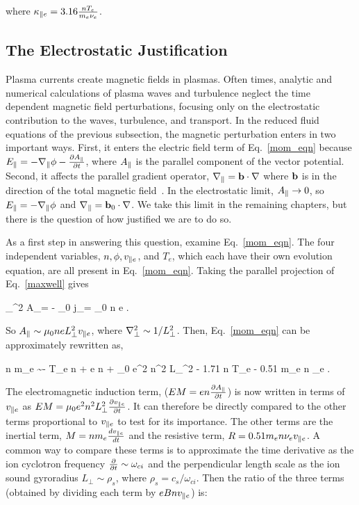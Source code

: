 where $\kappa_{\parallel e} = 3.16 \frac{n T_e}{m_e \nu_{e}}$.

\subsection{The Electrostatic Justification}
\label{ss_es_justification}

Plasma currents create magnetic fields in plasmas. Often times, analytic and numerical calculations
of plasma waves and turbulence neglect the time dependent magnetic field perturbations, focusing only on the electrostatic contribution to the waves, turbulence, and transport.
In the reduced fluid equations of the previous subsection, the magnetic perturbation enters in two important ways. First, it enters the electric field term of Eq.~\ref{mom_eqn}
because $E_\parallel = -\nabla_\parallel \phi - \frac{\partial A_\parallel}{\partial t}$, where $A_\parallel$ is the parallel component of the vector potential. Second, it affects the parallel gradient operator, 
$\nabla_\parallel = {\bf b} \cdot \nabla$ where ${\bf b}$ is in the direction of the total magnetic field~\cite{simakov2003}.
In the electrostatic limit, $A_\parallel \rightarrow 0$, so $E_\parallel = -\nabla_\parallel \phi$ and $\nabla_\parallel = {\bf b}_0 \cdot \nabla$. We take
this limit in the remaining chapters, but there is the question of how justified we are to do so. 

As a first step in answering this question, examine Eq.~\ref{mom_eqn}. The four independent variables, $n, \phi, v_{\parallel e}$, and $T_e$, which each have their own evolution equation, are all
present in Eq.~\ref{mom_eqn}. Taking the parallel projection of Eq.~\ref{maxwell} gives

\beq
\label{Apar_eqn}
\grad_\perp^2 A_\para = - \mu_0 j_\para = \mu_0 n e \vpe.
\eeq

So $A_\parallel \sim \mu_0 n e L_\perp^2 v_{\parallel e}$, where $\nabla_\perp^2 \sim 1/L_\perp^2$. Then, Eq.~\ref{mom_eqn} can be approximately rewritten as,

\beq
\label{mom_eqn_Apar}
n m_e  \sim - T_e \gradpar n + e n \gradpar \phi + \mu_0 e^2 n^2 L_\perp^2  - 1.71 n \gradpar T_e - 0.51 m_e n \nu_e \vpe.
\eeq

The electromagnetic induction term, ($EM = e n \frac{\partial A_\parallel}{\partial t}$) is now written in terms of $v_{\parallel e}$ as $EM = \mu_0 e^2 n^2 L_\perp^2 \frac{\partial v_{\parallel e}}{\partial t}$. 
It can therefore be directly compared to the other terms proportional to $v_{\parallel e}$ to test for its importance. 
The other terms are the inertial term, $M = n m_e \frac{dv_{\parallel e}}{dt}$ and the resistive term, $R = 0.51 m_e n \nu_e v_{\parallel e}$. A common way to compare these terms is to approximate the time
derivative as the ion cyclotron frequency $\frac{\partial}{\partial t} \sim \omega_{ci}$ and the perpendicular length scale as the ion sound gyroradius $L_\perp \sim \rho_s$, where $\rho_s = c_s/\omega_{ci}$.
Then the ratio of the three terms (obtained by dividing each term by $e B n v_{\parallel e}$) is: 

